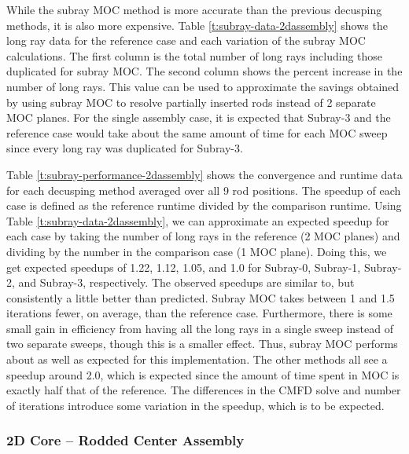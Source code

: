 While the subray MOC method is more accurate than the previous decusping methods, it is also more expensive.  Table \ref{t:subray-data-2dassembly} shows the long ray data for the reference case and each variation of the subray MOC calculations.  The first column is the total number of long rays including those duplicated for subray MOC.  The second column shows the percent increase in the number of long rays.  This value can be used to approximate the savings obtained by using subray MOC to resolve partially inserted rods instead of 2 separate MOC planes.  For the single assembly case, it is expected that Subray-3 and the reference case would take about the same amount of time for each MOC sweep since every long ray was duplicated for Subray-3.

Table \ref{t:subray-performance-2dassembly} shows the convergence and runtime data for each decusping method averaged over all 9 rod positions. The speedup of each case is defined as the reference runtime divided by the comparison runtime.  Using Table \ref{t:subray-data-2dassembly}, we can approximate an expected speedup for each case by taking the number of long rays in the reference (2 MOC planes) and dividing by the number in the comparison case (1 MOC plane).  Doing this, we get expected speedups of 1.22, 1.12, 1.05, and 1.0 for Subray-0, Subray-1, Subray-2, and Subray-3, respectively.  The observed speedups are similar to, but consistently a little better than predicted.  Subray MOC takes between 1 and 1.5 iterations fewer, on average, than the reference case.  Furthermore, there is some small gain in efficiency from having all the long rays in a single sweep instead of two separate sweeps, though this is a smaller effect.  Thus, subray MOC performs about as well as expected for this implementation.  The other methods all see a speedup around 2.0, which is expected since the amount of time spent in MOC is exactly half that of the reference.  The differences in the CMFD solve and number of iterations introduce some variation in the speedup, which is to be expected.

\subsubsection{2D Core -- Rodded Center Assembly}

